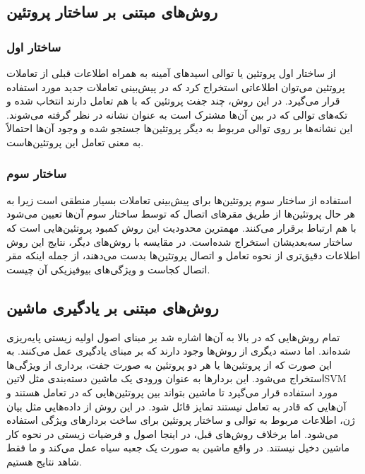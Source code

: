 \subsection{روش‌های مبتنی بر ساختار پروتئین}
\subsubsection{ساختار اول}
از ساختار اول پروتئین یا توالی اسید‌های آمینه به همراه اطلاعات قبلی از تعاملات پروتئین می‌توان اطلاعاتی استخراج کرد که در پیش‌بینی تعاملات جدید مورد استفاده قرار می‌گیرد. در این روش، چند جفت پروتئین که با هم تعامل دارند انتخاب شده و تکه‌های توالی که در بین آن‌ها مشترک است به عنوان نشانه در نظر گرفته می‌شوند. این نشانه‌ها بر روی توالی‌ مربوط به دیگر پروتئین‌ها جستجو شده و وجود آن‌ها احتمالاً به معنی تعامل این پروتئین‌هاست.

\subsubsection{ساختار سوم}
استفاده از ساختار سوم پروتئین‌ها برای پیش‌بینی تعاملات بسیار منطقی است زیرا به هر حال پروتئین‌ها از طریق مقر‌های اتصال که توسط ساختار سوم آن‌ها تعیین می‌شود با هم ارتباط برقرار می‌کنند. مهمترین محدودیت این روش کمبود پروتئین‌هایی است که ساختار سه‌بعدیشان استخراج شده‌است. در مقایسه با روش‌های دیگر، نتایج این روش اطلاعات دقیق‌تری از نحوه تعامل و اتصال پروتئین‌ها بدست می‌دهند، از جمله اینکه مقر اتصال کجاست و ویژگی‌های بیوفیزیکی آن چیست.

\subsection{روش‌های مبتنی بر یادگیری ماشین}
تمام روش‌هایی که در بالا به آن‌ها اشاره شد بر مبنای اصول اولیه زیستی پایه‌ریزی شده‌اند. اما دسته دیگری از روش‌ها وجود دارند که بر مبنای یادگیری عمل می‌کنند. به این صورت که از پروتئین‌ها یا هر دو پروتئین به صورت جفت، برداری از ویژگی‌ها استخراج می‌شود. این بردارها به عنوان ورودی یک ماشین دسته‌بندی مثل ‌لاتین{SVM} مورد استفاده قرار می‌گیرد تا ماشین بتواند بین پروتئین‌هایی که در تعامل هستند و آن‌هایی که قادر به تعامل نیستند تمایز قائل شود. در این روش‌ از داده‌هایی مثل بیان ژن‌، اطلاعات مربوط به توالی و ساختار پروتئین‌ برای ساخت بردارهای ویژگی استفاده می‌شود. اما برخلاف روش‌های قبل، در اینجا اصول و فرضیات زیستی در نحوه کار ماشین دخیل نیستند. در واقع ماشین به صورت یک جعبه سیاه عمل می‌کند و ما فقط شاهد نتایج هستیم.

